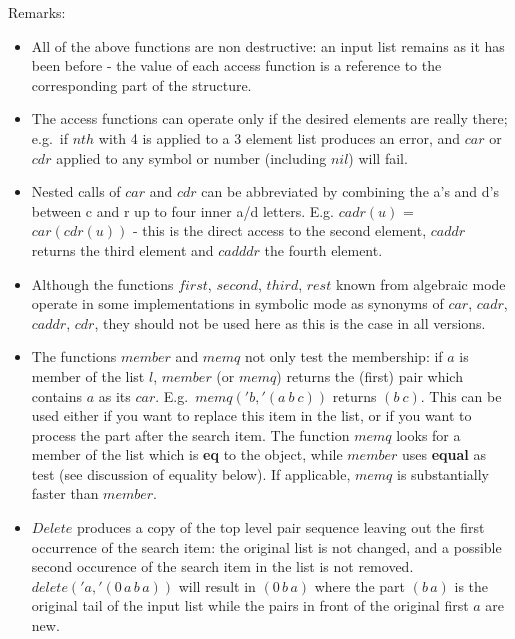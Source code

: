 Remarks:
\begin{itemize}
\item All of the above functions are non destructive: an
  input list remains as it has been before - the value of each
  access function is a reference to the corresponding part of the
  structure. 
\item The access functions can operate only if the desired elements
  are really there; e.g.\  if $nth$ with 4 is applied to a 3 element
  list produces an error, and $car$ or $cdr$ applied to any symbol
  or number (including $nil$) will fail.
\item Nested calls of $car$ and $cdr$ can be abbreviated by
  combining the a's and d's between c and r up to four inner a/d letters.
  E.g. $cadr(u)$ = $car(cdr(u))$ 
   - this is the direct access
  to the second element, $caddr$ returns the third element and
  $cadddr$ the fourth element.
\item Although the functions $first$, $second$, $third$, $rest$
  known from algebraic mode operate in some {\reduce}
  implementations in symbolic mode as synonyms of $car$,
  $cadr$, $caddr$, $cdr$, they should not be used here as
  this is the case in all {\reduce} versions.
\item The functions $member$ and $memq$ not only test the membership:
  if $a$ is member of the list $l$, $member$ (or $memq$) returns the (first)
  pair which contains $a$ as its $car$. E.g.\  $memq('b,'(a\ b\ c))$
  returns $(b\ c)$. This can be used either if you want to replace
  this item in the list, or if you want to process the part after
  the search item. 
  The function $memq$ looks for a member of the list which is {\bf eq}
  to the object, while $member$ uses {\bf equal} as test (see discussion
  of equality below).  If applicable, $memq$ is substantially faster than
  $member$.
\item $Delete$ produces a copy of the top level pair sequence leaving  
  out the first occurrence of the search item: the original list is
  not changed, and a possible second occurence of the search item
  in the list is not removed. $delete('a,'(0\,a\,b\,a))$ will result
  in $(0\,b\,a)$ where the part $(b\,a)$ is the original tail of the
  input list while the pairs in front of the original first $a$
  are new.
\end{itemize}


